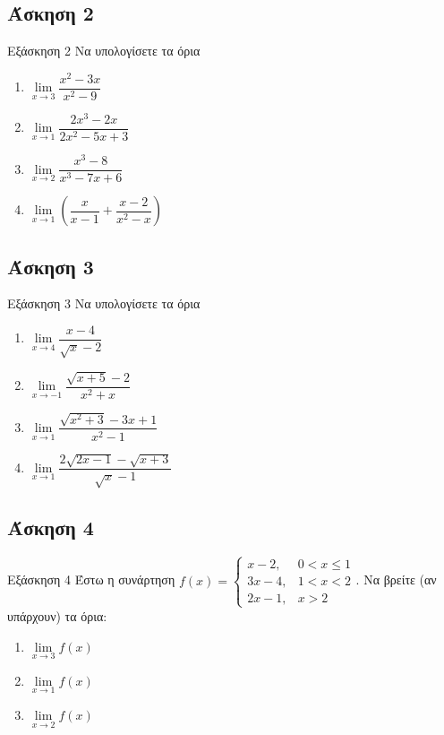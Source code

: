 \documentclass[greek]{beamer}
\begin{document}
\subsection{Άσκηση 2}
\begin{frame}[label=Άσκηση2,t]{Εξάσκηση 2}
  Να υπολογίσετε τα όρια
  \begin{enumerate}
    \item $\lim\limits_{x \to 3}{ \dfrac{x^2-3x}{x^2-9} }$ \pause
    \item $\lim\limits_{x \to 1}{ \dfrac{2x^3-2x}{2x^2-5x+3} }$ \pause
    \item $\lim\limits_{x \to 2}{ \dfrac{x^3-8}{x^3-7x+6} }$ \pause
    \item $\lim\limits_{x \to 1}{ \left( \dfrac{x}{x-1}+\dfrac{x-2}{x^2-x}  \right)  }$
  \end{enumerate}
\end{frame}

\subsection{Άσκηση 3}
\begin{frame}[label=Άσκηση3,t]{Εξάσκηση 3}
  Να υπολογίσετε τα όρια
  \begin{enumerate}
    \item $\lim\limits_{x \to 4}{ \dfrac{x-4}{\sqrt{x}-2} }$ \pause
    \item $\lim\limits_{x \to -1}{ \dfrac{\sqrt{x+5}-2}{x^2+x} }$ \pause
    \item $\lim\limits_{x \to 1}{ \dfrac{\sqrt{x^2+3}-3x+1}{x^2-1} }$ \pause
    \item $\lim\limits_{x \to 1}{ \dfrac{2\sqrt{2x-1}-\sqrt{x+3}}{\sqrt{x}-1} }$
  \end{enumerate}
\end{frame}

\subsection{Άσκηση 4}
\begin{frame}[label=Άσκηση4,t]{Εξάσκηση 4}
  Έστω η συνάρτηση $f(x)=\begin{cases}
      x-2,  & 0<x\le 1 \\
      3x-4, & 1<x<2    \\
      2x-1, & x>2
    \end{cases}$.
  Να βρείτε (αν υπάρχουν) τα όρια:
  \begin{enumerate}
    \item $\lim\limits_{x \to 3}{ f(x) }$ \pause
    \item $\lim\limits_{x \to 1}{ f(x) }$ \pause
    \item $\lim\limits_{x \to 2}{ f(x) }$
  \end{enumerate}
\end{frame}
\end{document}
